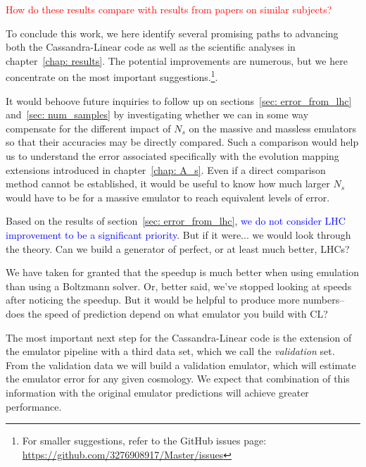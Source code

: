 \textcolor{red}{How do these results compare with results from 
papers on similar subjects?}


To conclude this work, we here identify several promising paths to advancing
both the Cassandra-Linear code as well as the scientific analyses in
chapter~\ref{chap: results}. The potential improvements are
numerous, but we here concentrate on the most important
suggestions.\footnote{For smaller suggestions, refer to the GitHub issues 
page: \url{https://github.com/3276908917/Master/issues}}.


It would behoove future inquiries to follow up on
sections~\ref{sec: error_from_lhc} and~\ref{sec: num_samples} by investigating 
whether we
can in some way compensate for the different impact of $N_s$ on the massive
and massless emulators so that their accuracies may be directly compared.
Such a comparison would help us to understand the error associated
specifically with the evolution mapping extensions introduced in
chapter~\ref{chap: A_s}. Even if a direct comparison method cannot be
established, it would be useful to know how much larger $N_s$ would have to
be for a massive emulator to reach equivalent levels of error.

Based on the results of section~\ref{sec: error_from_lhc},
\textcolor{blue}{we do not consider LHC improvement to be a significant
priority}. But if it were... we would look through the theory. Can we build
a generator of perfect, or at least much  better, LHCs?

We have taken for granted that the speedup is much better when using emulation
than using a Boltzmann solver. Or, better said, we've stopped looking at
speeds after noticing the speedup. But it would be helpful to produce more
numbers--does the speed of prediction depend on what emulator you build with
CL?


The most important next step for the Cassandra-Linear code is the
extension of the emulator pipeline with a third data set, which we call the
\textit{validation} set. From the validation data we will build a validation
emulator, which will estimate the emulator error for any given cosmology.
We expect that combination of this information with the original emulator
predictions will achieve greater performance. 

